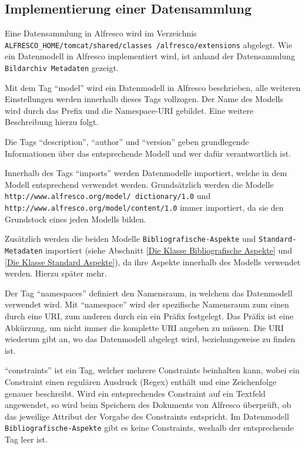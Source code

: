 \FloatBarrier
\subsection{Implementierung einer Datensammlung}
Eine Datensammlung in Alfresco wird im Verzeichnis \texttt{ALFRESCO\_HOME/tomcat/shared/classes
/alfresco/extensions} abgelegt.
Wie ein Datenmodell in Alfresco implementiert wird, ist anhand der Datensammlung \texttt{Bildarchiv Metadaten} gezeigt.

Mit dem Tag "`model"' wird ein Datenmodell in Alfresco beschrieben, alle weiteren Einstellungen werden innerhalb dieses Tags vollzogen. Der Name des Modells wird durch das Prefix und die Namespace-URI gebildet. Eine weitere Beschreibung hierzu folgt.

Die Tags "`description"', "`author"' und "`version"' geben grundlegende Informationen \"uber das entsprechende Modell und wer daf\"ur verantwortlich ist.

Innerhalb des Tags "`imports"' werden Datenmodelle importiert, welche in dem Modell entsprechend verwendet werden. Grunds\"atzlich werden die Modelle \texttt{http://www.alfresco.org/model/ dictionary/1.0} und \texttt{http://www.alfresco.org/model/content/1.0} immer importiert, da sie den Grundstock eines jeden Modells bilden.

Zus\"atzlich werden die beiden Modelle \texttt{Bibliografische-Aspekte} und \texttt{Standard-Metadaten} importiert (siehe Abschnitt \ref{Die Klasse Bibliografische Aspekte} und \ref{Die Klasse Standard Aspekte}), da ihre Aspekte innerhalb des Modells verwendet werden. Hierzu sp\"ater mehr.

Der Tag "`namespaces"' definiert den Namensraum, in welchem das Datenmodell verwendet wird. Mit "`namespace"' wird der spezifische Namensraum zum einen durch eine URI, zum anderen durch ein ein Pr\"afix festgelegt. Das Pr\"afix ist eine Abk\"urzung, um nicht immer die komplette URI angeben zu m\"ussen. Die URI wiederum gibt an, wo das Datenmodell abgelegt wird, beziehungsweise zu finden ist.

"`constraints"' ist ein Tag, welcher mehrere Constraints beinhalten kann, wobei ein Constraint einen regul\"aren Ausdruck (Regex) enth\"alt und eine Zeichenfolge genauer beschreibt. Wird ein entsprechendes Constraint auf ein Textfeld angewendet, so wird beim Speichern des Dokuments von Alfresco \"uberpr\"uft, ob das jeweilige Attribut der Vorgabe des Constraints entspricht. Im Datenmodell \texttt{Bibliografische-Aspekte} gibt es keine Constraints, weshalb der entsprechende Tag leer ist.

